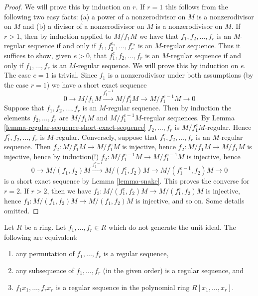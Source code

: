 \begin{proof}
We will prove this by induction on $r$. If $r = 1$ this follows from the
following two easy facts: (a) a power of a nonzerodivisor on $M$
is a nonzerodivisor on $M$ and (b) a divisor of a nonzerodivisor on $M$
is a nonzerodivisor on $M$.
If $r > 1$, then by induction applied to $M/f_1M$ we have that
$f_1, f_2, \ldots, f_r$ is an $M$-regular sequence if and only if
$f_1, f_2^{e_2}, \ldots, f_r^{e_r}$ is an $M$-regular sequence.
Thus it suffices to show, given $e > 0$, that $f_1^e, f_2, \ldots, f_r$
is an $M$-regular sequence if and only if $f_1, \ldots, f_r$
is an $M$-regular sequence. We will prove this
by induction on $e$. The case $e = 1$ is trivial. Since $f_1$ is a
nonzerodivisor under both assumptions (by the case $r = 1$)
we have a short exact sequence
$$
0 \to M/f_1M \xrightarrow{f_1^{e - 1}} M/f_1^eM \to M/f_1^{e - 1}M \to 0
$$
Suppose that $f_1, f_2, \ldots, f_r$ is an $M$-regular sequence.
Then by induction the elements $f_2, \ldots, f_r$ are $M/f_1M$ and
$M/f_1^{e - 1}M$-regular sequences. By
Lemma \ref{lemma-regular-sequence-short-exact-sequence}
$f_2, \ldots, f_r$ is $M/f_1^eM$-regular. Hence $f_1^e, f_2, \ldots, f_r$
is $M$-regular. Conversely, suppose
that $f_1^e, f_2, \ldots, f_r$ is an $M$-regular sequence. Then
$f_2 : M/f_1^eM \to M/f_1^eM$ is injective, hence
$f_2 : M/f_1M \to M/f_1M$ is injective, hence by induction(!)
$f_2 : M/f_1^{e - 1}M \to M/f_1^{e - 1}M$ is injective, hence
$$
0 \to
M/(f_1, f_2)M \xrightarrow{f_1^{e - 1}}
M/(f_1^e, f_2)M \to
M/(f_1^{e - 1}, f_2)M \to 0
$$
is a short exact sequence by Lemma \ref{lemma-snake}. This proves the
converse for $r = 2$. If $r > 2$, then we have
$f_3 : M/(f_1^e, f_2)M \to M/(f_1^e, f_2)M$ is injective, hence
$f_3 : M/(f_1, f_2)M \to M/(f_1, f_2)M$ is injective, and so on.
Some details omitted.
\end{proof}

\begin{lemma}
\label{lemma-regular-sequence-in-polynomial-ring}
Let $R$ be a ring. Let $f_1, \ldots, f_r \in R$ which do not generate
the unit ideal. The following are equivalent:
\begin{enumerate}
\item any permutation of $f_1, \ldots, f_r$ is a regular sequence,
\item any subsequence of $f_1, \ldots, f_r$ (in the given order) is
a regular sequence, and
\item $f_1x_1, \ldots, f_rx_r$ is a regular sequence in the polynomial
ring $R[x_1, \ldots, x_r]$.
\end{enumerate}
\end{lemma}

